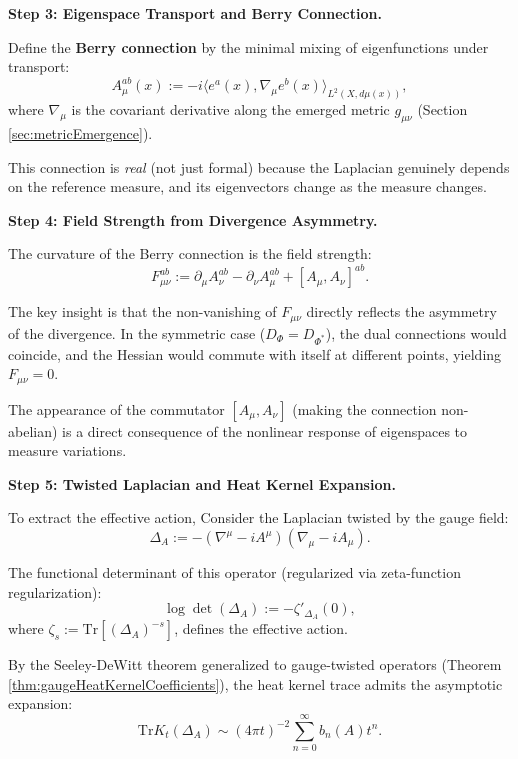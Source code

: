 \textbf{Step 3: Eigenspace Transport and Berry Connection.}

Define the \textbf{Berry connection} by the minimal mixing of eigenfunctions under transport:
\begin{equation}
A_\mu^{ab}(x) := -i \langle e^a(x), \nabla_\mu e^b(x) \rangle_{L^2(X, d\mu(x))},
\end{equation}
where $\nabla_\mu$ is the covariant derivative along the emerged metric $g_{\mu\nu}$ (Section \ref{sec:metricEmergence}).

This connection is \textit{real} (not just formal) because the Laplacian genuinely depends on the reference measure, and its eigenvectors change as the measure changes.

\textbf{Step 4: Field Strength from Divergence Asymmetry.}

The curvature of the Berry connection is the field strength:
\begin{equation}
F_{\mu\nu}^{ab} := \partial_\mu A_\nu^{ab} - \partial_\nu A_\mu^{ab} + [A_\mu, A_\nu]^{ab}.
\end{equation}

The key insight is that the non-vanishing of $F_{\mu\nu}$ directly reflects the asymmetry of the divergence. In the symmetric case ($D_\Phi = D_{\Phi^*}$), the dual connections would coincide, and the Hessian would commute with itself at different points, yielding $F_{\mu\nu} = 0$.

The appearance of the commutator $[A_\mu, A_\nu]$ (making the connection non-abelian) is a direct consequence of the nonlinear response of eigenspaces to measure variations.

\textbf{Step 5: Twisted Laplacian and Heat Kernel Expansion.}

To extract the effective action, Consider the Laplacian twisted by the gauge field:
\begin{equation}
\Delta_A := -(\nabla^\mu - iA^\mu)(\nabla_\mu - iA_\mu).
\end{equation}

The functional determinant of this operator (regularized via zeta-function regularization):
\begin{equation}
\log \det(\Delta_A) := -\zeta'_{\Delta_A}(0),
\end{equation}
where $\zeta_s := \text{Tr}[(\Delta_A)^{-s}]$, defines the effective action.

By the Seeley-DeWitt theorem generalized to gauge-twisted operators (Theorem \ref{thm:gaugeHeatKernelCoefficients}), the heat kernel trace admits the asymptotic expansion:
\begin{equation}
\text{Tr} K_t(\Delta_A) \sim (4\pi t)^{-2} \sum_{n=0}^\infty b_n(A) t^n.
\end{equation}

